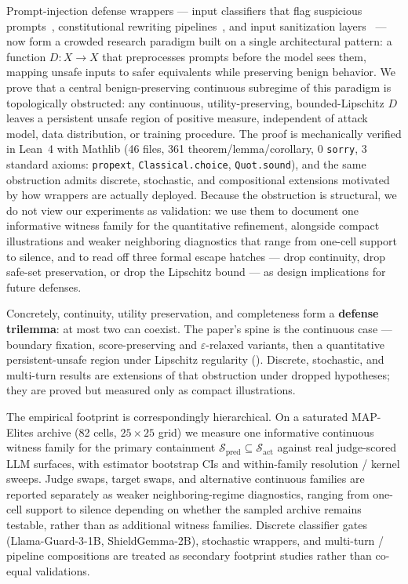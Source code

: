 \documentclass[11pt]{article}
\begin{document}
Prompt-injection defense wrappers --- input classifiers that flag
suspicious prompts~\cite{alon2023detecting}, constitutional rewriting
pipelines~\cite{bai2022constitutional}, and input sanitization
layers~\cite{inan2023llama} --- now form a crowded research paradigm
built on a single architectural pattern: a function $D\colon X \to X$
that preprocesses prompts before the model sees them, mapping unsafe
inputs to safer equivalents while preserving benign behavior. We prove
that a central benign-preserving continuous subregime of this
paradigm is topologically obstructed: any
continuous, utility-preserving, bounded-Lipschitz $D$ leaves a
persistent unsafe region of positive measure, independent of attack
model, data distribution, or training procedure. The proof is
mechanically verified in Lean~4 with Mathlib (46 files, 361
theorem/lemma/corollary, 0 \texttt{sorry}, 3 standard axioms:
\texttt{propext}, \texttt{Classical.choice}, \texttt{Quot.sound}), and
the same obstruction admits discrete, stochastic, and compositional
extensions motivated by how wrappers are actually deployed. Because
the obstruction is structural, we do not view our experiments as
validation: we use them to document one informative witness family for
the quantitative refinement, alongside compact illustrations and
weaker neighboring diagnostics that range from one-cell support to
silence, and to read off three formal
escape hatches --- drop
continuity, drop safe-set preservation, or drop the Lipschitz bound
--- as design implications for future defenses.

Concretely, continuity, utility preservation, and completeness form a
\textbf{defense trilemma}: at most two can coexist. The paper's spine is
the continuous case --- boundary fixation, score-preserving and
$\varepsilon$-relaxed variants, then a quantitative persistent-unsafe
region under Lipschitz regularity
().
Discrete, stochastic, and multi-turn results are extensions of that
obstruction under dropped hypotheses; they are proved but measured only
as compact illustrations.

The empirical footprint is correspondingly hierarchical. On a saturated
MAP-Elites archive (82 cells, $25\times25$ grid) we measure one
informative continuous witness family for the primary containment
$\mathcal{S}_{\mathrm{pred}} \subseteq \mathcal{S}_{\mathrm{act}}$
against real judge-scored LLM surfaces, with estimator bootstrap CIs
and within-family resolution / kernel sweeps. Judge swaps, target
swaps, and alternative continuous families are reported separately as
weaker neighboring-regime diagnostics, ranging from one-cell support
to silence depending on whether the sampled archive remains testable,
rather than as additional witness families.
Discrete classifier gates (Llama-Guard-3-1B, ShieldGemma-2B),
stochastic wrappers, and multi-turn / pipeline compositions are
treated as secondary footprint studies rather than co-equal
validations.
\end{document}
